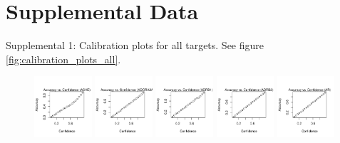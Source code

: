 \documentclass[10pt,article]{memoir}
\begin{document}


\newpage
\appendix
\section*{Supplemental Data}
%
%

Supplemental 1: Calibration plots for all targets. See figure
\ref{fig:calibration_plots_all}.

\begin{figure}[h!]
\includegraphics[width=0.19\textwidth]{figures/calibration_plots/ache_calib.pdf}
\includegraphics[width=0.19\textwidth]{figures/calibration_plots/adora2a_calib.pdf}
\includegraphics[width=0.19\textwidth]{figures/calibration_plots/adrb1_calib.pdf}
\includegraphics[width=0.19\textwidth]{figures/calibration_plots/adrb2_calib.pdf}
\includegraphics[width=0.19\textwidth]{figures/calibration_plots/ar_calib.pdf}

\end{figure}
\end{document}
